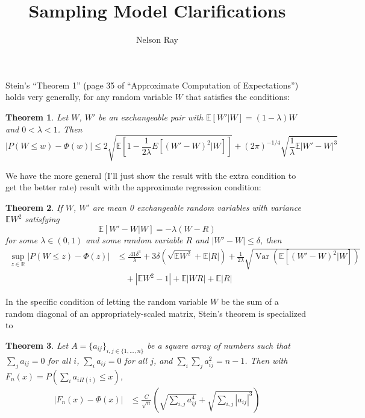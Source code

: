 \documentclass{amsart}
\newtheorem{theorem}{Theorem}
\newcommand{\E}{\mathbb{E}}
\DeclareMathOperator*{\var}{Var}
\begin{document}
\title{Sampling Model Clarifications}
\author{Nelson Ray}
\maketitle

Stein's ``Theorem 1'' (page 35 of ``Approximate Computation of Expectations'') holds very generally,
for any random variable $W$ that satisfies the conditions:
\begin{theorem}
  Let $W$, $W'$ be an exchangeable pair with $\E [W'|W] = (1-\lambda)W$ and $0 < \lambda < 1$.
  Then
  \begin{equation*}
    |P(W \leq w) - \Phi(w)| \leq 2\sqrt{\E[1 - \frac{1}{2 \lambda}E[(W'-W)^2|W] ]} +
    (2 \pi)^{-1/4}\sqrt{\frac{1}{\lambda}\E |W'-W|^3}
  \end{equation*}
\end{theorem}

We have the more general (I'll just show the result with the extra condition to get the better rate) result with the approximate
regression condition:
\begin{theorem}
  If $W$, $W'$ are mean 0 exchangeable random variables with variance
  $\E W^2$
  satisfying
  \begin{equation*}
    \E[W'-W|W] = -\lambda(W-R)
  \end{equation*}
  for some $\lambda \in (0,1)$ and some random variable $R$ and $|W'-W| \leq \delta$, then
  \begin{equation*}
    \begin{split}
      \sup_{z \in \mathbb{R}} |P(W \leq z) - \Phi(z)|
      &\leq \frac{.41 \delta^3}{\lambda} + 3 \delta (\sqrt{\E W^2} + \E |R|)
      + \frac{1}{2\lambda} \sqrt{\var (\E [(W'-W)^2|W])} \\
      &\quad + |\E W^2 - 1| + \E |WR| + \E |R|
    \end{split}
  \end{equation*}
\end{theorem}

In the specific condition of letting the random variable $W$ be the sum of a random diagonal
of an appropriately-scaled matrix, Stein's theorem is specialized to
\begin{theorem}
  Let $A = \{a_{ij}\}_{i, j \in \{1, \ldots, n\}}$ be a square array of
  numbers such that $\sum_j a_{ij} = 0$ for all $i$, $\sum_i
  a_{ij} = 0$ for all $j$, and $\sum_i \sum_j a_{ij}^2 = n - 1$.
  Then with $F_n(x) = P(\sum_i a_{i\Pi(i)} \leq x)$,
  \begin{align*}
    |F_n(x) - \Phi(x)| &\leq \frac{C}{\sqrt{n}}
    \left (
      \sqrt{\sum_{i,j}a_{ij}^4} + \sqrt{\sum_{i,j}|a_{ij}|^3}
    \right )
  \end{align*}
\end{theorem}
\end{document}
